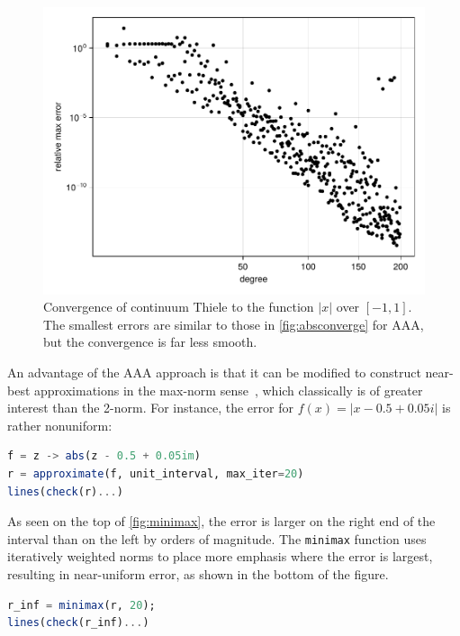 \documentclass{juliacon}
\begin{document}
\begin{figure}
\centering
\includegraphics[width=\columnwidth]{absthiele.pdf}
\caption{Convergence of continuum Thiele to the function $|x|$ over $[-1,1]$. The smallest errors are similar to those in \autoref{fig:absconverge} for AAA, but the convergence is far less smooth.}
\label{fig:absthiele}
\end{figure}

An advantage of the AAA approach is that it can be modified to construct near-best approximations in the max-norm sense~\cite{nakatsukasaAlgorithmReal2020}, which classically is of greater interest than the 2-norm. For instance, the error for $f(x)=|x-0.5 + 0.05i|$ is rather nonuniform:
\begin{lstlisting}[language = Julia, caption={Continuum AAA for $|x-0.5 + 0.05i|$.}]
f = z -> abs(z - 0.5 + 0.05im)
r = approximate(f, unit_interval, max_iter=20)
lines(check(r)...)
\end{lstlisting}
As seen on the top of \autoref{fig:minimax}, the error is larger on the right end of the interval than on the left by orders of magnitude. The \verb|minimax| function uses iteratively weighted norms to place more emphasis where the error is largest, resulting in near-uniform error, as shown in the bottom of the figure.
\begin{lstlisting}[language = Julia, caption={Minimax AAA for $|x-0.5 + 0.05i|$.}]
r_inf = minimax(r, 20);
lines(check(r_inf)...)
\end{lstlisting}
\end{document}

